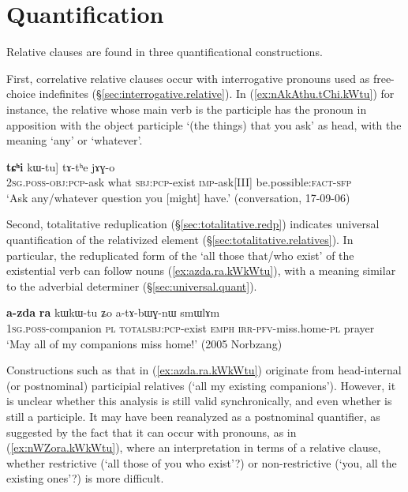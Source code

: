  
\section{Quantification} \label{sec:headless.relatives.quantification}
Relative clauses are found in three quantificational constructions. 

First, correlative relative clauses occur with interrogative pronouns used as free-choice indefinites (§\ref{sec:interrogative.relative}). In (\ref{ex:nAkAthu.tChi.kWtu}) for instance, the relative whose main verb is the participle  has the pronoun  in apposition with the object participle  `(the things) that you ask' as head, with the meaning `any' or `whatever'.

\begin{exe}
\ex \label{ex:nAkAthu.tChi.kWtu}
\gll [[\textbf{nɤ-kɤ-tʰu}] \textbf{tɕʰi} kɯ-tu] tɤ-tʰe jɤɣ-o \\
\textsc{2sg}.\textsc{poss}-\textsc{obj}:\textsc{pcp}-ask what \textsc{sbj}:\textsc{pcp}-exist \textsc{imp}-ask[III] be.possible:\textsc{fact}-\textsc{sfp} \\
\glt `Ask any/whatever question you [might] have.' (conversation, 17-09-06)
\end{exe}

 
Second, totalitative reduplication (§\ref{sec:totalitative.redp}) indicates universal quantification of the relativized element (§\ref{sec:totalitative.relatives}). In particular, the reduplicated form of the  `all those that/who exist' of the existential verb  can follow nouns (\ref{ex:azda.ra.kWkWtu}), with a meaning similar to the adverbial determiner  (§\ref{sec:universal.quant}). 

\begin{exe}
\ex \label{ex:azda.ra.kWkWtu}
\gll \textbf{a-zda} \textbf{ra} kɯ\redp{}kɯ-tu ʑo a-tɤ-bɯɣ-nɯ smɯlɤm \\
\textsc{1sg}.\textsc{poss}-companion \textsc{pl} \textsc{total}\redp{}\textsc{sbj}:\textsc{pcp}-exist \textsc{emph} \textsc{irr}-\textsc{pfv}-miss.home-\textsc{pl} prayer \\
\glt `May all of my companions miss home!' (2005 Norbzang)
\end{exe}

Constructions such as that in (\ref{ex:azda.ra.kWkWtu}) originate from head-internal (or postnominal) participial relatives (`all my existing companions'). However, it is unclear whether this analysis is still valid synchronically, and even whether  is still a participle. It may have been reanalyzed as a postnominal quantifier, as suggested by the fact that it can occur with pronouns, as in (\ref{ex:nWZora.kWkWtu}), where an interpretation in terms of a relative clause, whether restrictive (`all those of you who exist'?) or non-restrictive (`you, all the existing ones'?) is more difficult.
 
